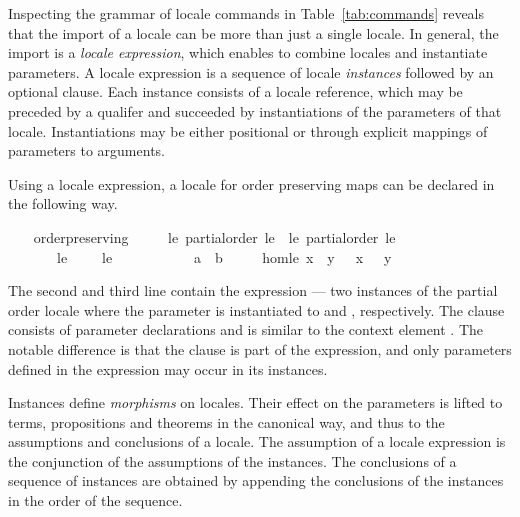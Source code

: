 \begin{isabellebody}
\begin{isamarkuptext}
  Inspecting the grammar of locale commands in
  Table~\ref{tab:commands} reveals that the import of a locale can be
  more than just a single locale.  In general, the import is a
  \emph{locale expression}, which enables to combine locales
  and instantiate parameters.  A locale expression is a sequence of
  locale \emph{instances} followed by an optional 
  clause.  Each instance consists of a locale reference, which may be
  preceded by a qualifer and succeeded by instantiations of the
  parameters of that locale.  Instantiations may be either positional
  or through explicit mappings of parameters to arguments.

  Using a locale expression, a locale for order
  preserving maps can be declared in the following way.%
\end{isamarkuptext}%
\isamarkuptrue%
\ \ \isamarkupfalse%
\ order{\isacharunderscore}preserving\ {\isacharequal}\isanewline
\ \ \ \ le{\isacharcolon}\ partial{\isacharunderscore}order\ le\ {\isacharplus}\ le{\isacharprime}{\isacharcolon}\ partial{\isacharunderscore}order\ le{\isacharprime}\isanewline
\ \ \ \ \ \ \ le\ {\isacharparenleft}\ {\isachardoublequoteopen}{\isasymsqsubseteq}{\isachardoublequoteclose}\ {}{}{\isacharparenright}\ \ le{\isacharprime}\ {\isacharparenleft}\ {\isachardoublequoteopen}{\isasympreceq}{\isachardoublequoteclose}\ {}{}{\isacharparenright}\ {\isacharplus}\isanewline
\ \ \ \ \ {\isasymphi}\ {\isacharcolon}{\isacharcolon}\ {\isachardoublequoteopen}{\isacharprime}a\ {\isasymRightarrow}\ {\isacharprime}b{\isachardoublequoteclose}\isanewline
\ \ \ \ \ hom{\isacharunderscore}le{\isacharcolon}\ {\isachardoublequoteopen}x\ {\isasymsqsubseteq}\ y\ {\isasymLongrightarrow}\ {\isasymphi}\ x\ {\isasympreceq}\ {\isasymphi}\ y{\isachardoublequoteclose}%
\begin{isamarkuptext}%
The second and third line contain the expression --- two
  instances of the partial order locale where the parameter is
  instantiated to 
  and , respectively.  The  clause consists
  of parameter declarations and is similar to the context element
  .  The notable difference is that the
   clause is part of the expression, and only
  parameters defined in the expression may occur in its instances.

  Instances define \emph{morphisms} on locales.  Their effect on the
  parameters is lifted to terms, propositions and theorems in the
  canonical way,
  and thus to the assumptions and conclusions of a locale.  The
  assumption of a locale expression is the conjunction of the
  assumptions of the instances.  The conclusions of a sequence of
  instances are obtained by appending the conclusions of the
  instances in the order of the sequence.


\end{isamarkuptext}
\end{isabellebody}
